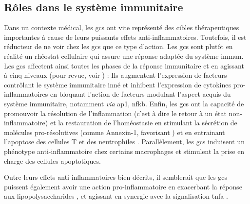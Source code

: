 \documentclass[../main.tex]{subfiles}
\begin{document}

	\subsection{Rôles dans le système immunitaire}\label{subsec:gc-immune}
		Dans un contexte médical, les \glspl{gc} ont vite représenté des cibles thérapeutiques importantes à cause de leurs puissants effets anti-inflammatoires.
		Toutefois, il est réducteur de ne voir chez les \glspl{gc} que ce type d'action.
		Les \glspl{gc} sont plutôt en réalité un rhéostat cellulaire qui assure une réponse adaptée du système immun.
		Les \glspl{gc} affectent ainsi toutes les phases de la réponse immunitaire et en agissant à cinq niveaux (pour revue, voir \citealp{Busillo2013}) :
		Ils augmentent l'expression de facteurs contrôlant le système immunitaire inné et inhibent l'expression de cytokines pro-inflammatoires en bloquant l'action de facteurs modulant l'aspect acquis du système immunitaire, notamment \textit{via} \gls{ap1}, \gls{nfkb}.
		Enfin, les \glspl{gc} ont la capacité de promouvoir la résolution de l'inflammation (c'est à dire le retour à un état non-inflammatoire) et la restauration de l'homéostasie en stimulant la sécrétion de molécules pro-résolutives (comme Annexin-1, favorisant ) et en entrainant l'apoptose des cellules T et des neutrophiles \citep{Parrillo1979}.
		Parallèlement, les \glspl{gc} induisent un phénotype anti-inflammatoire chez certains macrophages et stimulent la prise en charge des cellules apoptotiques.
		\par
		Outre leurs effets anti-inflammatoires bien décrits, il semblerait que les \glspl{gc} puissent également avoir une action pro-inflammatoire en exacerbant la réponse aux lipopolysaccharides \citep{Munhoz2010,Frank2012}, et agissant en synergie avec la signalisation \gls{tnfa} \citep{Lannan2012}.

\end{document}
